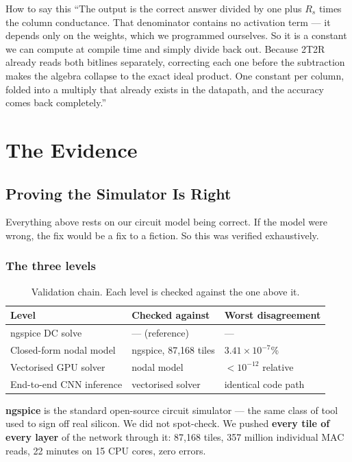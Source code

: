 \documentclass[11pt,a4paper]{report}
\newcommand{\jargon}[1]{\textcolor{acc}{\textbf{#1}}}
\begin{document}
\begin{saybox}{How to say this}
``The output is the correct answer divided by one plus $R_s$ times the column
conductance. That denominator contains no activation term --- it depends only
on the weights, which we programmed ourselves. So it is a constant we can
compute at compile time and simply divide back out. Because 2T2R already reads
both bitlines separately, correcting each one before the subtraction makes the
algebra collapse to the exact ideal product. One constant per column, folded
into a multiply that already exists in the datapath, and the accuracy comes
back completely.''
\end{saybox}

\part{The Evidence}
\chapter{Proving the Simulator Is Right}

Everything above rests on our circuit model being correct. If the model were
wrong, the fix would be a fix to a fiction. So this was verified exhaustively.

\section{The three levels}

\begin{table}[h]
\centering
\caption{Validation chain. Each level is checked against the one above it.}
\begin{tabular}{lll}
\toprule
Level & Checked against & Worst disagreement \\
\midrule
ngspice DC solve & --- (reference) & --- \\
Closed-form nodal model & ngspice, 87{,}168 tiles & $3.41\times10^{-7}$\% \\
Vectorised GPU solver & nodal model & $<10^{-12}$ relative \\
End-to-end CNN inference & vectorised solver & identical code path \\
\bottomrule
\end{tabular}
\end{table}

\jargon{ngspice} is the standard open-source circuit simulator --- the same
class of tool used to sign off real silicon. We did not spot-check. We pushed
\textbf{every tile of every layer} of the network through it: 87{,}168 tiles,
357 million individual MAC reads, 22 minutes on 15 CPU cores, zero errors.
\end{document}
